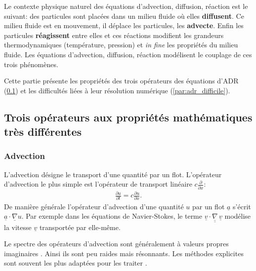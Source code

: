 Le contexte physique naturel des équations d'advection, diffusion, réaction est le suivant:
des particules sont placées dans un milieu fluide où elles \textbf{diffusent}. Ce milieu fluide
est en mouvement, il déplace les particules, les \textbf{advecte}.
Enfin les particules \textbf{réagissent} entre elles et ces réactions modifient les grandeurs thermodynamiques (température, pression) et \textit{in fine} les propriétés
du milieu fluide.
Les équations d'advection, diffusion, réaction modélisent le couplage de ces trois phénomènes.\par 
Cette partie présente les propriétés des trois opérateurs des équations d'ADR (\ref{par:adr_3_operator}) et
les difficultés liées à leur résolution numérique (\ref{par:adr_difficile}).

\subsection{Trois opérateurs aux propriétés mathématiques très différentes}\label{par:adr_3_operator}
\subsubsection{Advection}
    L'advection désigne le transport d'une quantité par un flot. L'opérateur d'advection le plus simple est l'opérateur
    de transport linéaire $c \frac{\partial}{\partial x}$:
    \begin{align}\frac{\partial u}{\partial t} = c \frac{\partial u}{\partial x}.\end{align}
    De manière générale l'opérateur d’advection d'une quantité $u$ par un flot $\underline a$ s'écrit $\underline a \cdot \underline{\nabla} u$.
    Par exemple dans les équations de Navier-Stokes, le terme $\underline{v} \cdot \underline{\underline \nabla} \, \underline{v}$ modélise 
    la vitesse $\underline v$ transportée par elle-même.\par
    Le spectre des opérateurs d'advection sont généralement à valeurs propres imaginaires \cite[Chap.~10]{LeVeque2007}.
    Ainsi ils sont peu raides mais résonnants. Les méthodes explicites sont souvent les plus adaptées pour les traiter \cite[Chap.~10]{LeVeque2007}.

